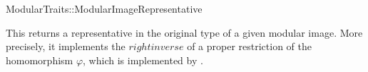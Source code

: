 \begin{ccRefFunctionObjectConcept}{ModularTraits::ModularImageRepresentative}

\ccDefinition

This  returns a representative in the original type of a given modular image. More precisely, it implements the $right inverse$ of a proper restriction of the homomorphism $\varphi$, which is implemented by . 

\ccTypes
{}


 
\ccRefines 
{} 

\ccSeeAlso
{}

\end{ccRefFunctionObjectConcept}
